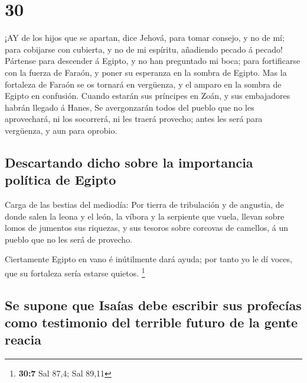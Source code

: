 \hypertarget{section-29}{%
\section{30}\label{section-29}}

 ¡AY de los hijos que se apartan, dice Jehová, para tomar
consejo, y no de mí; para cobijarse con cubierta, y no de mi espíritu,
añadiendo pecado á pecado!  Pártense para descender á
Egipto, y no han preguntado mi boca; para fortificarse con la fuerza de
Faraón, y poner su esperanza en la sombra de Egipto.  Mas la
fortaleza de Faraón se os tornará en vergüenza, y el amparo en la sombra
de Egipto en confusión.  Cuando estarán sus príncipes en
Zoán, y sus embajadores habrán llegado á Hanes,  Se
avergonzarán todos del pueblo que no les aprovechará, ni los socorrerá,
ni les traerá provecho; antes les será para vergüenza, y aun para
oprobio.

\hypertarget{descartando-dicho-sobre-la-importancia-poluxedtica-de-egipto}{%
\subsection{Descartando dicho sobre la importancia política de
Egipto}\label{descartando-dicho-sobre-la-importancia-poluxedtica-de-egipto}}

 Carga de las bestias del mediodía: Por tierra de
tribulación y de angustia, de donde salen la leona y el león, la víbora
y la serpiente que vuela, llevan sobre lomos de jumentos sus riquezas, y
sus tesoros sobre corcovas de camellos, á un pueblo que no les será de
provecho.

 Ciertamente Egipto en vano é inútilmente dará ayuda; por
tanto yo le dí voces, que su fortaleza sería estarse quietos.
\footnote{\textbf{30:7} Sal 87,4; Sal 89,11}

\hypertarget{se-supone-que-isauxedas-debe-escribir-sus-profecuxedas-como-testimonio-del-terrible-futuro-de-la-gente-reacia}{%
\subsection{Se supone que Isaías debe escribir sus profecías como
testimonio del terrible futuro de la gente
reacia}\label{se-supone-que-isauxedas-debe-escribir-sus-profecuxedas-como-testimonio-del-terrible-futuro-de-la-gente-reacia}}

